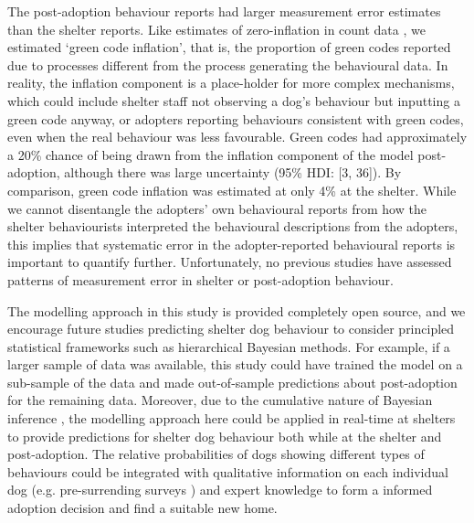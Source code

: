 \documentclass[fleqn,10pt]{wlscirep}
\begin{document}
The post-adoption behaviour reports had larger measurement error estimates than the shelter reports. Like estimates of zero-inflation in count data \cite{lambert1992}, we estimated `green code inflation', that is, the proportion of green codes reported due to processes different from the process generating the behavioural data. In reality, the inflation component is a place-holder for more complex mechanisms, which could include shelter staff not observing a dog's behaviour but inputting a green code anyway, or adopters reporting behaviours consistent with green codes, even when the real behaviour was less favourable. Green codes had approximately a 20\% chance of being drawn from the inflation component of the model post-adoption, although there was large uncertainty (95\% HDI: [3, 36]). By comparison, green code inflation was estimated at only 4\% at the shelter. While we cannot disentangle the adopters' own behavioural reports from how the shelter behaviourists interpreted the behavioural descriptions from the adopters, this implies that systematic error in the adopter-reported behavioural reports is important to quantify further. Unfortunately, no previous studies have assessed patterns of measurement error in shelter or post-adoption behaviour.

The modelling approach in this study is provided completely open source, and we encourage future studies predicting shelter dog behaviour to consider principled statistical frameworks such as hierarchical Bayesian methods. For example, if a larger sample of data was available, this study could have trained the model on a sub-sample of the data and made out-of-sample predictions about post-adoption for the remaining data. Moreover, due to the cumulative nature of Bayesian inference \cite{mcelreath2020}, the modelling approach here could be applied in real-time at shelters to provide predictions for shelter dog behaviour both while at the shelter and post-adoption. The relative probabilities of dogs showing different types of behaviours could be integrated with qualitative information on each individual dog (e.g. pre-surrending surveys \cite{ASPCA2018}) and expert knowledge to form a informed adoption decision and find a suitable new home.
\end{document}
